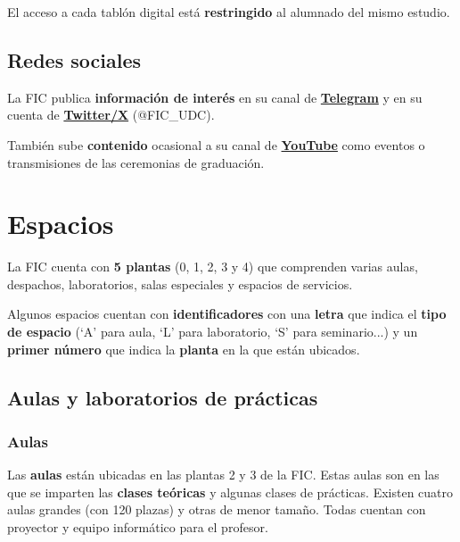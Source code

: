 \begin{warningBox}
    El acceso a cada tablón digital está \textbf{restringido} al alumnado del mismo estudio.
\end{warningBox}

\subsection{Redes sociales}

La \acrshort{FIC} publica \textbf{información de interés} en su canal de \href{https://t.me/+LHa3QApmGskyNDFk}{\textbf{Telegram}} y en su cuenta de \href{https://x.com/FIC_UDC}{\textbf{Twitter/X}} (@FIC\_UDC).

También sube \textbf{contenido} ocasional a su canal de \href{https://www.youtube.com/@facultaddeinformaticadeaco4211}{\textbf{YouTube}} como eventos o transmisiones de las ceremonias de graduación.


\section{Espacios}

La \acrshort{FIC} cuenta con \textbf{5 plantas} (0, 1, 2, 3 y 4) que comprenden varias aulas, despachos, laboratorios, salas especiales y espacios de servicios.

\begin{infoBox}
    Algunos espacios cuentan con \textbf{identificadores} con una \textbf{letra} que indica el \textbf{tipo de espacio} (`A' para aula, `L' para laboratorio, `S' para seminario...) y un \textbf{primer número} que indica la \textbf{planta} en la que están ubicados.
\end{infoBox}

\subsection{Aulas y laboratorios de prácticas}

\subsubsection{Aulas}

Las \textbf{aulas} están ubicadas en las plantas 2 y 3 de la 
\acrshort{FIC}. Estas aulas son en las que se imparten las \textbf{clases teóricas} y algunas clases de prácticas. Existen cuatro aulas grandes (con 120 plazas) y otras de menor tamaño. Todas cuentan con proyector y equipo informático para el profesor.

